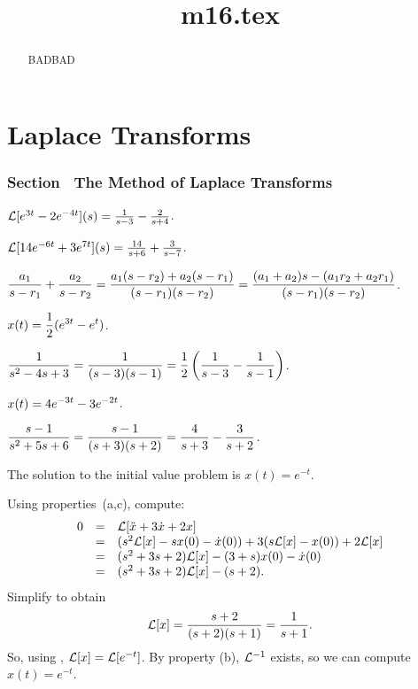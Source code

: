 \documentclass{ximera}
\title{m16.tex}
\begin{document}
\begin{abstract}
BADBAD
\end{abstract}
\maketitle

\chapter{Laplace Transforms}

\subsection*{Section~\protect{\ref{S:13.1}} The Method of Laplace Transforms}

 \ans ${\cal L}[e^{3t}-2e^{-4t}](s) = \frac{1}{s-3} -
\frac{2}{s+4}$.

 \ans ${\cal L}[14e^{-6t}+3e^{7t}](s) = \frac{14}{s+6} +
\frac{3}{s-7}$.

 $\displaystyle\frac{a_1}{s-r_1} + \frac{a_2}{s-r_2} = 
\frac{a_1(s-r_2)+a_2(s-r_1)}{(s-r_1)(s-r_2)} =
\frac{(a_1+a_2)s - (a_1r_2+a_2r_1)}{(s-r_1)(s-r_2)}$.


 \ans $\displaystyle x(t) = \frac{1}{2}(e^{3t}-e^t)$.

\soln $\displaystyle\frac{1}{s^2-4s+3} = \frac{1}{(s-3)(s-1)} =
\frac{1}{2}\left(\frac{1}{s-3} - \frac{1}{s-1}\right)$.


 \ans $\displaystyle x(t) = 4e^{-3t}-3e^{-2t}$.

\soln $\displaystyle\frac{s-1}{s^2+5s+6} = \frac{s-1}{(s+3)(s+2)} =
\frac{4}{s+3} - \frac{3}{s+2}$.

 \ans The solution to the initial value problem is
$x(t) = e^{-t}$.

\soln Using properties~(a,c), compute:
\[
\begin{array}{rcl}
0 & = & {\cal L}[\ddot{x} + 3\dot{x} + 2x] \\
& = & (s^2{\cal L}[x] - sx(0) - \dot{x}(0)) + 3(s{\cal L}[x] - x(0))
+ 2{\cal L}[x] \\
& = & (s^2 + 3s + 2){\cal L}[x] - (3 + s)x(0) - \dot{x}(0) \\
& = & (s^2 + 3s + 2){\cal L}[x] - (s + 2).
\end{array}
\]
Simplify to obtain
\[
{\cal L}[x] = \frac{s + 2}{(s + 2)(s + 1)} = \frac{1}{s + 1}.
\]
So, using ,
${\cal L}[x] = {\cal L}[e^{-t}]$.  By property (b),
${\cal L}^{-1}$ exists, so we can compute $x(t) = e^{-t}$.
\end{document}
